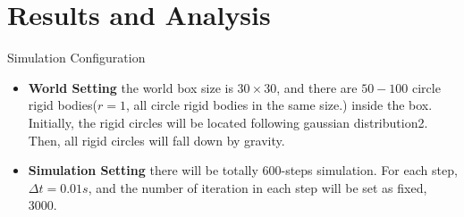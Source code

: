 \documentclass{beamer}
\begin{document}
\section{Results and Analysis}

\begin{frame}{Simulation Configuration}
\begin{itemize}
\item {
\textbf{World Setting}
\pause
the world box size is $30 \times 30$, and there are $50-100$ circle rigid bodies($r = 1$, all circle rigid bodies in the same size.) inside the box. Initially, the rigid circles will be located following gaussian distribution2. Then, all rigid circles will fall down by gravity.
\pause
}
\item {
\textbf{Simulation Setting}
\pause
there will be totally 600-steps simulation. For each step, $\Delta t = 0.01s$, and the number of iteration in each step will be set as fixed, 3000.
}

\end{itemize}
\end{frame}
\end{document}
